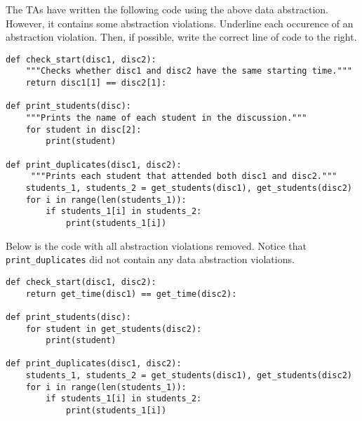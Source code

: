 \question
The TAs have written the following code using the above data abstraction.
However, it contains some abstraction violations. Underline each occurence of
an abstraction violation. Then, if possible, write the correct line of code to the right.

\begin{lstlisting}
def check_start(disc1, disc2):
    """Checks whether disc1 and disc2 have the same starting time."""
    return disc1[1] == disc2[1]:

def print_students(disc):
    """Prints the name of each student in the discussion."""
    for student in disc[2]:
        print(student)

def print_duplicates(disc1, disc2):
     """Prints each student that attended both disc1 and disc2."""
    students_1, students_2 = get_students(disc1), get_students(disc2)
    for i in range(len(students_1)):
        if students_1[i] in students_2:
            print(students_1[i])
\end{lstlisting}

\begin{solution}[.5cm]
Below is the code with all abstraction violations removed. Notice that
{\tt print\_duplicates} did not contain any data abstraction violations.
\begin{lstlisting}
def check_start(disc1, disc2):
    return get_time(disc1) == get_time(disc2):

def print_students(disc):
    for student in get_students(disc2):
        print(student)

def print_duplicates(disc1, disc2):
    students_1, students_2 = get_students(disc1), get_students(disc2)
    for i in range(len(students_1)):
        if students_1[i] in students_2:
            print(students_1[i])
\end{lstlisting}
\end{solution}
